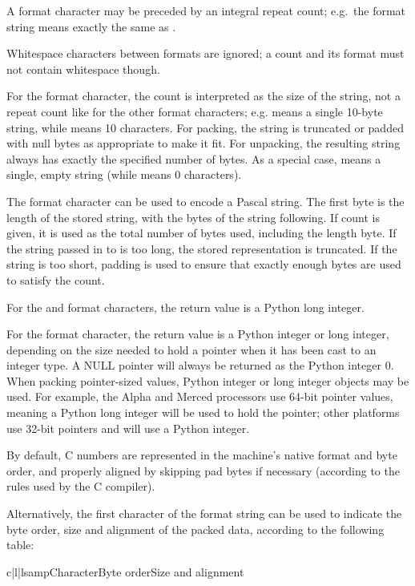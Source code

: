 A format character may be preceded by an integral repeat count; e.g.\
the format string  means exactly the same as .

Whitespace characters between formats are ignored; a count and its
format must not contain whitespace though.

For the  format character, the count is interpreted as the
size of the string, not a repeat count like for the other format
characters; e.g. \code{'10s'} means a single 10-byte string, while
\code{'10c'} means 10 characters.  For packing, the string is
truncated or padded with null bytes as appropriate to make it fit.
For unpacking, the resulting string always has exactly the specified
number of bytes.  As a special case, \code{'0s'} means a single, empty
string (while \code{'0c'} means 0 characters).

The  format character can be used to encode a Pascal
string.  The first byte is the length of the stored string, with the
bytes of the string following.  If count is given, it is used as the
total number of bytes used, including the length byte.  If the string
passed in to \function{pack()} is too long, the stored representation
is truncated.  If the string is too short, padding is used to ensure
that exactly enough bytes are used to satisfy the count.

For the  and  format characters, the return
value is a Python long integer.

For the  format character, the return value is a Python
integer or long integer, depending on the size needed to hold a
pointer when it has been cast to an integer type.  A NULL pointer will
always be returned as the Python integer 0. When packing pointer-sized
values, Python integer or long integer objects may be used.  For
example, the Alpha and Merced processors use 64-bit pointer values,
meaning a Python long integer will be used to hold the pointer; other
platforms use 32-bit pointers and will use a Python integer.

By default, C numbers are represented in the machine's native format
and byte order, and properly aligned by skipping pad bytes if
necessary (according to the rules used by the C compiler).

Alternatively, the first character of the format string can be used to
indicate the byte order, size and alignment of the packed data,
according to the following table:

\begin{tableiii}{c|l|l}{samp}{Character}{Byte order}{Size and alignment}
  \lineiii{@}{native}{native}
\end{tableiii}


